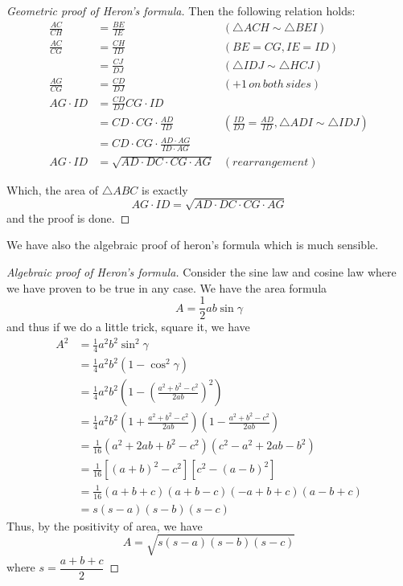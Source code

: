 \documentclass[12pt]{article}
\begin{document}
\begin{proof}[Geometric proof of Heron's formula]
        Then the following relation holds:\begin{align*}
            \frac{AC}{CH}&=\frac{BE}{IE}&(\triangle ACH \sim \triangle BEI)\\
            \frac{AC}{CG}&=\frac{CH}{ID}&(BE=CG,IE=ID)\\
            &=\frac{CJ}{DJ}&(\triangle IDJ \sim \triangle HCJ)\\
            \frac{AG}{CG}&=\frac{CD}{DJ}&(+1\, on\, both\, sides)\\
            AG\cdot ID&=\frac{CD}{DJ}CG\cdot ID\\
            &=CD\cdot CG\cdot \frac{AD}{ID}&(\frac{ID}{DJ}=\frac{AD}{ID},\triangle ADI\sim\triangle IDJ)\\
            &=CD\cdot CG\cdot \frac{AD\cdot AG}{ID\cdot AG}\\
            AG\cdot ID&=\sqrt{AD\cdot DC\cdot CG\cdot AG}&(rearrangement)
        \end{align*}

        Which, the area of $\triangle ABC$ is exactly $$AG\cdot ID=\sqrt{AD\cdot DC\cdot CG\cdot AG}$$ and the proof is done.
    \end{proof}

    We have also the algebraic proof of heron's formula which is much sensible.

    \begin{proof}[Algebraic proof of Heron's formula]
        Consider the sine law and cosine law where we have proven to be true in any case. We have the area formula $$A=\frac{1}{2}ab\sin{\gamma}$$ and thus if we do a little trick, square it, we have \begin{align*}
            A^2&=\frac{1}{4}a^2b^2\sin^2{\gamma}\\
            &=\frac{1}{4}a^2b^2(1-\cos^2{\gamma})\\
            &=\frac{1}{4}a^2b^2(1-(\frac{a^2+b^2-c^2}{2ab})^2)\\
            &=\frac{1}{4}a^2b^2(1+\frac{a^2+b^2-c^2}{2ab})(1-\frac{a^2+b^2-c^2}{2ab})\\
            &=\frac{1}{16}(a^2+2ab+b^2-c^2)(c^2-a^2+2ab-b^2)\\
            &=\frac{1}{16}[(a+b)^2-c^2][c^2-(a-b)^2]\\
            &=\frac{1}{16}(a+b+c)(a+b-c)(-a+b+c)(a-b+c)\\
            &=s(s-a)(s-b)(s-c)
        \end{align*}
        Thus, by the positivity of area, we have $$A=\sqrt{s(s-a)(s-b)(s-c)}$$ where $s=\dfrac{a+b+c}{2}$
    \end{proof}
\end{document}
